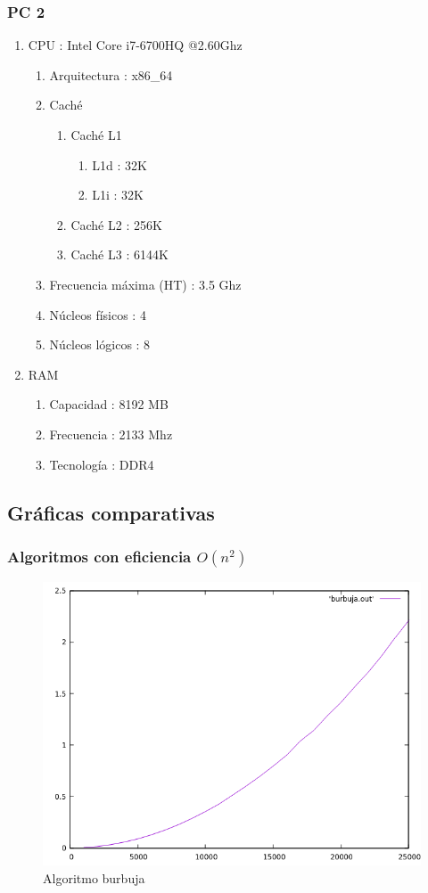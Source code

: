 \documentclass[12pt,spanish]{article}
\begin{document}
\subsubsection{PC 2}
\label{sec:pc2}
\begin{enumerate}
	\item CPU : Intel Core i7-6700HQ @2.60Ghz
	\begin{enumerate}
		\item Arquitectura : x86\_64
		\item Caché
		\begin{enumerate}
			\item Caché L1
			\begin{enumerate}
				\item L1d : 32K
				\item L1i : 32K
			\end{enumerate}
			\item Caché L2 : 256K
			\item Caché L3 : 6144K
		\end{enumerate}
		\item Frecuencia máxima (HT) : 3.5 Ghz
		\item Núcleos físicos : 4
		\item Núcleos lógicos : 8
	\end{enumerate}
	\item RAM
	\begin{enumerate}
		\item Capacidad : 8192 MB
		\item Frecuencia : 2133 Mhz
		\item Tecnología : DDR4
	\end{enumerate}
\end{enumerate}
\subsection{Gráficas comparativas}

\subsubsection{Algoritmos con eficiencia $O(n^2)$}
\begin{figure}[H]
\centering
\includegraphics[scale=0.75]{empirica_burbuja.png}
\caption{Algoritmo burbuja}
\end{figure}
\end{document}

